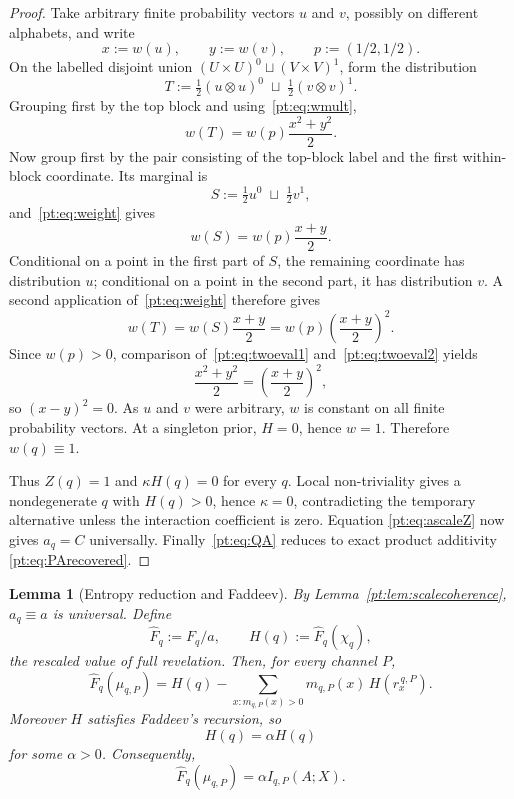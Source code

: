 \documentclass[11pt,a4paper]{article}
\newtheorem{lemma}[theorem]{Lemma}
\theoremstyle{definition}
\newcommand{\Sh}{H}
\newcommand{\1}{\mathbf 1}
\begin{document}
\begin{proof}
Take arbitrary finite probability vectors $u$ and $v$, possibly on different alphabets, and write
\[
x:=w(u),\qquad y:=w(v),\qquad p:=(1/2,1/2).
\]
On the labelled disjoint union $(U\times U)^0\sqcup(V\times V)^1$, form the distribution
\[
T:=\tfrac12(u\otimes u)^0\;\sqcup\;\tfrac12(v\otimes v)^1.
\]
Grouping first by the top block and using~\eqref{pt:eq:wmult},
\begin{equation}
w(T)=w(p)\frac{x^2+y^2}{2}.
\tag{E1}\label{pt:eq:twoeval1}
\end{equation}
Now group first by the pair consisting of the top-block label and the first within-block coordinate.  Its marginal is
\[
S:=\tfrac12u^0\;\sqcup\;\tfrac12v^1,
\]
and~\eqref{pt:eq:weight} gives
\[
w(S)=w(p)\frac{x+y}{2}.
\]
Conditional on a point in the first part of $S$, the remaining coordinate has distribution $u$; conditional on a point in
the second part, it has distribution $v$.  A second application of~\eqref{pt:eq:weight} therefore gives
\begin{equation}
w(T)=w(S)\frac{x+y}{2}
=w(p)\left(\frac{x+y}{2}\right)^2.
\tag{E2}\label{pt:eq:twoeval2}
\end{equation}
Since $w(p)>0$, comparison of~\eqref{pt:eq:twoeval1} and~\eqref{pt:eq:twoeval2} yields
\[
\frac{x^2+y^2}{2}=\left(\frac{x+y}{2}\right)^2,
\]
so $(x-y)^2=0$.  As $u$ and $v$ were arbitrary, $w$ is constant on all finite probability vectors.  At a singleton prior,
$H=0$, hence $w=1$.  Therefore $w(q)\equiv1$.

Thus $Z(q)=1$ and $\kappa H(q)=0$ for every $q$.  Local non-triviality gives a nondegenerate $q$ with $H(q)>0$, hence
$\kappa=0$, contradicting the temporary alternative unless the interaction coefficient is zero.  Equation
\eqref{pt:eq:ascaleZ} now gives $a_q=C$ universally.  Finally~\eqref{pt:eq:QA} reduces to exact product additivity
\eqref{pt:eq:PArecovered}.
\end{proof}

\begin{lemma}[Entropy reduction and Faddeev]\label{pt:lem:faddeevsketch}
By Lemma~\ref{pt:lem:scalecoherence}, $a_q\equiv a$ is universal.  Define
\[
\widehat F_q:=F_q/a,
\qquad
H(q):=\widehat F_q(\chi_q),
\]
the rescaled value of full revelation.  Then, for every channel $P$,
\[
\widehat F_q(\mu_{q,P})
=
H(q)-\sum_{x:m_{q,P}(x)>0}m_{q,P}(x)\,H(r_x^{\,q,P}).
\tag{ER}
\]
Moreover $H$ satisfies Faddeev's recursion, so
\[
H(q)=\alpha \Sh(q)
\]
for some $\alpha>0$.  Consequently,
\[
\widehat F_q(\mu_{q,P})=\alpha I_{q,P}(A;X).
\]
\end{lemma}
\end{document}
